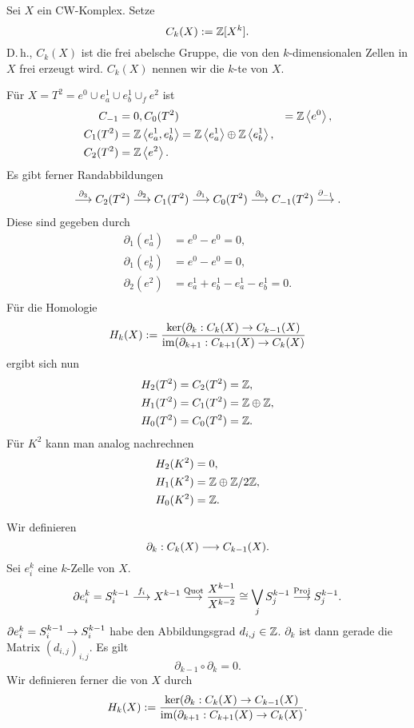 \Def{}
Sei $X$ ein CW-Komplex. Setze
\[ C_k(X) := \mathbb{Z}[X^k]. \]
D.\,h., $C_k(X)$ ist die frei abelsche Gruppe, die von den $k$-dimensionalen Zellen in $X$ frei erzeugt wird. $C_k(X)$ nennen wir die $k$-te  von $X$.

\Bsp{}
Für $X = T^2 = e^0 \cup e_a^1\cup e_b^1 \cup_f e^2$ ist
\begin{align*}
C_{-1} &= 0,
C_0(T^2) &= \mathbb{Z}\left<e^0\right>,\\
C_1(T^2) &= \mathbb{Z}\left<e^1_a, e^1_b\right> = \mathbb{Z}\left<e^1_a\right> \oplus \mathbb{Z}\left<e^1_b\right>,\\
C_2(T^2) &= \mathbb{Z} \left<e^2\right>.
\end{align*}
Es gibt ferner Randabbildungen
\begin{align*}
\overset{\partial_3}{\longrightarrow} C_2(T^2) \overset{\partial_2}{\longrightarrow}
C_1(T^2) \overset{\partial_1}{\longrightarrow}
C_0(T^2) \overset{\partial_0}{\longrightarrow}
C_{-1}(T^2) \overset{\partial_{-1}}{\longrightarrow}.
\end{align*}
Diese sind gegeben durch
\begin{align*}
\partial_1(e^1_a) &= e^0 - e^0 = 0,\\
\partial_1(e^1_b) &= e^0 - e^0 = 0,\\
\partial_2(e^2) &= e^1_a + e^1_b - e^1_a - e^1_b = 0.\\
\end{align*}
Für die Homologie
\[ H_k(X) 
:=
\frac{ \ker (\partial_k : C_k(X) \overset{}{\rightarrow} C_{k-1}(X)}{ \mathrm{im}(\partial_{k+1} : C_{k+1}(X) \overset{}{\rightarrow} C_k(X) }
\]
ergibt sich nun
\begin{align*}
H_2(T^2) &= C_2(T^2) = \mathbb{Z},\\
H_1(T^2) &= C_1(T^2) = \mathbb{Z}\oplus \mathbb{Z},\\
H_0(T^2) &= C_0(T^2) = \mathbb{Z}.
\end{align*}
Für $K^2$ kann man analog nachrechnen
\begin{align*}
H_2(K^2) &= 0,\\
H_1(K^2) &= \mathbb{Z} \oplus \mathbb{Z} /2\mathbb{Z} ,\\
H_0(K^2) &= \mathbb{Z}.
\end{align*}


Wir definieren 
\[ \partial_{k} : C_k(X) \overset{}{\longrightarrow} C_{k-1}(X).  \]
Sei $e^k_i$ eine $k$-Zelle von $X$.
\[ \partial e_i^k = S^{k-1}_i \overset{f_i}{\longrightarrow} X^{k-1} \overset{\mathrm{Quot}}{\longrightarrow} \frac{X^{k-1}}{X^{k-2}} \overset{}{\cong} \bigvee_j S_j^{k-1} \overset{\mathrm{Proj}}{\longrightarrow}S_j^{k-1}. \]
$\partial e_i^k = S^{k-1}_i \overset{}{\rightarrow} S^{k-1}_i$ habe den Abbildungsgrad $d_{i,j} \in \mathbb{Z}$. $\partial_k$ ist dann gerade die Matrix $(d_{i,j})_{i,j}$. Es gilt
\[ \partial_{k-1} \circ \partial_k = 0. \]
Wir definieren ferner die  von $X$ durch
\[ H_k(X) 
:=
\frac{ \ker (\partial_k : C_k(X) \overset{}{\rightarrow} C_{k-1}(X)}{ \mathrm{im}(\partial_{k+1} : C_{k+1}(X) \overset{}{\rightarrow} C_k(X) }.
\]